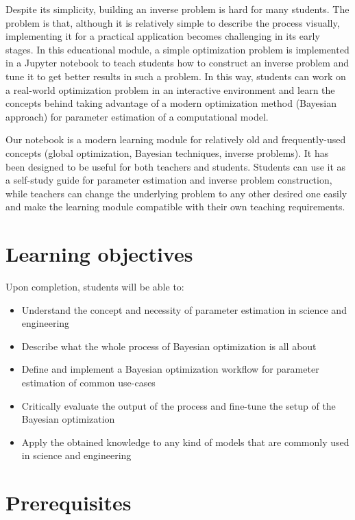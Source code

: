 Despite its simplicity, building an inverse problem is hard for many students. The problem is that, although it is relatively simple to describe the process visually, implementing it for a practical application becomes challenging in its early stages. In this educational module, a simple optimization problem is implemented in a Jupyter notebook to teach students how to construct an inverse problem and tune it to get better results in such a problem. In this way, students can work on a real-world optimization problem in an interactive environment and learn the concepts behind taking advantage of a modern optimization method (Bayesian approach) for parameter estimation of a computational model.

Our notebook is a modern learning module for relatively old and frequently-used concepts (global optimization, Bayesian techniques, inverse problems). It has been designed to be useful for both teachers and students. Students can use it as a self-study guide for parameter estimation and inverse problem construction, while teachers can change the underlying problem to any other desired one easily and make the learning module compatible with their own teaching requirements.

\section{Learning objectives}

Upon completion, students will be able to:

\begin{itemize}
\item
Understand the concept and necessity of parameter estimation in science and engineering
\item
Describe what the whole process of Bayesian optimization is all about
\item
Define and implement a Bayesian optimization workflow for parameter estimation of common use-cases
\item
Critically evaluate the output of the process and fine-tune the setup of the Bayesian optimization
\item
Apply the obtained knowledge to any kind of models that are commonly used in science and engineering
\end{itemize}

\section{Prerequisites}

